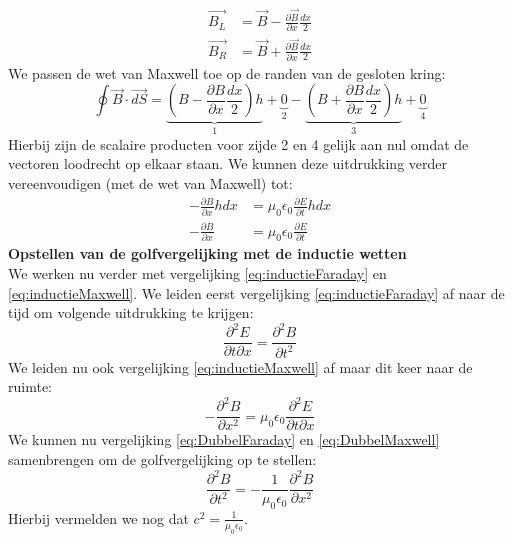\documentclass[a4paper,kul]{kulakarticle} %
\begin{document}
\begin{align*}
	\vec{B_L} &= \vec{B}-\frac{\partial\vec{B}}{\partial x}\frac{dx}{2}\\
	\vec{B_R} &= \vec{B}+\frac{\partial\vec{B}}{\partial x}\frac{dx}{2}	
\end{align*}
We passen de wet van Maxwell toe op de randen van de gesloten kring:
\begin{equation*}
	\oint\vec{B}\cdot\vec{dS} = \underbrace{(B-\frac{\partial B}{\partial x}\frac{dx}{2})h}_1 + \underbrace{0}_2 -\underbrace{(B+\frac{\partial B}{\partial x}\frac{dx}{2})h}_3 + \underbrace{0}_4
\end{equation*}
Hierbij zijn de scalaire producten voor zijde 2 en 4 gelijk aan nul omdat de vectoren loodrecht op elkaar staan. We kunnen deze uitdrukking verder vereenvoudigen (met de wet van Maxwell) tot:
\begin{align}
	-\frac{\partial B}{\partial x}hdx &= \mu_0\epsilon_0\frac{\partial E}{\partial t}hdx\\
	\label{eq:inductieMaxwell}
	-\frac{\partial B}{\partial x} &= \mu_0\epsilon_0\frac{\partial E}{\partial t}
\end{align}
\newpage
\textbf{Opstellen van de golfvergelijking met de inductie wetten}\\
We werken nu verder met vergelijking \ref{eq:inductieFaraday} en \ref{eq:inductieMaxwell}. We leiden eerst vergelijking \ref{eq:inductieFaraday} af naar de tijd om volgende uitdrukking te krijgen:
\begin{equation}
	\label{eq:DubbelFaraday}
	\frac{\partial^2E}{\partial t\partial x} = \frac{\partial^2B}{\partial t^2}
\end{equation}
We leiden nu ook vergelijking \ref{eq:inductieMaxwell} af maar dit keer naar de ruimte:
\begin{equation}
	\label{eq:DubbelMaxwell}
	-\frac{\partial^2B}{\partial x^2} = \mu_0\epsilon_0\frac{\partial^2E}{\partial t\partial x}
\end{equation}
We kunnen nu vergelijking \ref{eq:DubbelFaraday} en \ref{eq:DubbelMaxwell} samenbrengen om de golfvergelijking op te stellen:
\begin{equation*}
\frac{\partial^2B}{\partial t^2}=-\frac{1}{\mu_0\epsilon_0}\frac{\partial^2B}{\partial x^2}
\end{equation*}
Hierbij vermelden we nog dat $c^2=\frac{1}{\mu_0\epsilon_0}$.
\newpage
\end{document}
